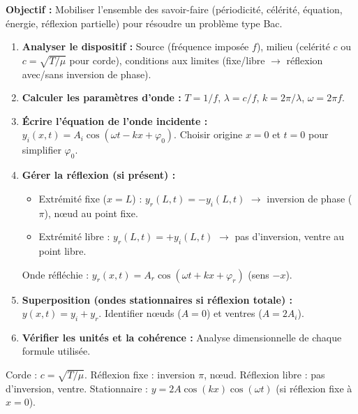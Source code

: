 \documentclass[11pt]{article}
\begin{document}
\begin{methode}
\textbf{Objectif :} Mobiliser l'ensemble des savoir-faire (périodicité, célérité, équation, énergie, réflexion partielle) pour résoudre un problème type Bac.
\begin{enumerate}
    \item \textbf{Analyser le dispositif :} Source (fréquence imposée $f$), milieu (celérité $c$ ou $c=\sqrt{T/\mu}$ pour corde), conditions aux limites (fixe/libre $\rightarrow$ réflexion avec/sans inversion de phase).
    \item \textbf{Calculer les paramètres d'onde :} $T=1/f$, $\lambda=c/f$, $k=2\pi/\lambda$, $\omega=2\pi f$.
    \item \textbf{Écrire l'équation de l'onde incidente :} $y_i(x,t) = A_i \cos(\omega t - k x + \varphi_0)$. Choisir origine $x=0$ et $t=0$ pour simplifier $\varphi_0$.
    \item \textbf{Gérer la réflexion (si présent) :} 
    \begin{itemize}
        \item Extrémité fixe ($x=L$) : $y_r(L,t) = -y_i(L,t)$ $\rightarrow$ inversion de phase ($\pi$), nœud au point fixe.
        \item Extrémité libre : $y_r(L,t) = +y_i(L,t)$ $\rightarrow$ pas d'inversion, ventre au point libre.
    \end{itemize}
    Onde réfléchie : $y_r(x,t) = A_r \cos(\omega t + k x + \varphi_r)$ (sens $-x$).
    \item \textbf{Superposition (ondes stationnaires si réflexion totale) :} $y(x,t) = y_i + y_r$. Identifier nœuds ($A=0$) et ventres ($A=2A_i$).
    \item \textbf{Vérifier les unités et la cohérence :} Analyse dimensionnelle de chaque formule utilisée.
\end{enumerate}
\begin{aretenir}Corde : $c = \sqrt{T/\mu}$. Réflexion fixe : inversion $\pi$, nœud. Réflexion libre : pas d'inversion, ventre. Stationnaire : $y=2A\cos(kx)\cos(\omega t)$ (si réflexion fixe à $x=0$).\end{aretenir}
\end{methode}
\end{document}
